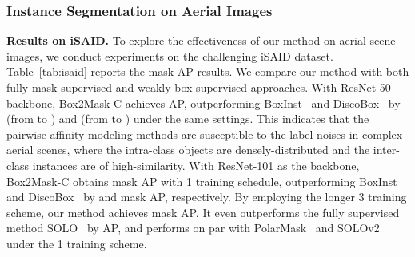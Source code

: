 \documentclass[12pt,onecolumn,letterpaper]{article}
\begin{document}
\subsubsection{Instance Segmentation on Aerial Images}
\textbf{Results on iSAID.} 
To explore the effectiveness of our method on aerial scene images, we conduct experiments on the challenging iSAID dataset. Table~\ref{tab:isaid} reports the mask AP results. 
We compare our method with both fully mask-supervised and weakly box-supervised approaches.
With ResNet-50 backbone, Box2Mask-C achieves  AP, outperforming BoxInst~\cite{cvpr2021_boxinst} and DiscoBox~\cite{iccv2021discobox} by  (from  to  ) and  (from  to ) under the same settings. This indicates that the pairwise affinity modeling methods are  susceptible to the label noises in complex aerial scenes, where the intra-class objects are densely-distributed and the inter-class instances are of high-similarity. 
With ResNet-101 as the backbone, Box2Mask-C obtains  mask AP with 1 training schedule, outperforming BoxInst~\cite{cvpr2021_boxinst} and DiscoBox~\cite{iccv2021discobox} by  and  mask AP, respectively. By employing the longer 3 training scheme, our method achieves  mask AP. It even outperforms the fully supervised method SOLO~\cite{wang2020solo} by  AP, and performs on par with PolarMask~\cite{cvpr_2020polarmask} and SOLOv2~\cite{wang2020solov2} under the 1 training scheme. 
\end{document}

